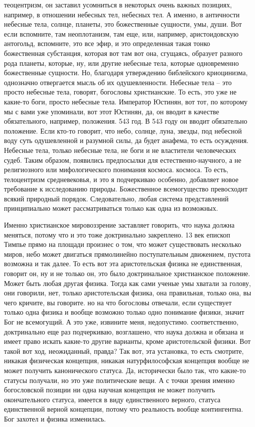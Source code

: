 теоцентризм, он заставил усомниться в некоторых
очень важных позициях, например, в отношении небесных тел, небесных тел. А
именно, в античности небесные тела, солнце, планеты, это божественные сущности,
умы, души. Вот если вспомните, там неоплотанизм, там еще, или, например,
аристоидовскую антогольд, вспомните, это все эфир, и это определенная такая
тонко божественная субстанция, которая вот там вот она, сгущаясь, образует
разного рода планеты, которые, ну, или другие небесные тела, которые
одновременно божественные сущности. Но, благодаря утверждению библейского
криоцинизма, однозначно отвергается мысль об их одушевленности. Небесные тела –
это просто небесные тела, говорят, богословы христианские. То есть, это уже не
какие-то боги, просто небесные тела. Император Юстинян, вот тот, по которому мы
с вами уже упоминали, вот этот Юстинян, да, он вводит в качестве обязательного,
например, положения. 543 год. В 543 году он вводит обязательно положение. Если
кто-то говорит, что небо, солнце, луна, звезды, под небесной воду суть
одушевленной и разумной силы, да будет анафема, то есть осуждения. Небесные
тела, только небесные тела, не боги и не властители человеческих судеб. Таким
образом, появились предпосылки для естественно-научного, а не религиозного или
мифологического понимания космоса. космоса. То есть, телоцентризм средневековья,
и это я подчеркиваю особенно, добавляет новое требование к исследованию природы.
Божественное всемогущество превосходит всякий природный порядок. Следовательно,
любая система представлений принципиально может рассматриваться только как одна
из возможных. 

Именно христианское мировоззрение заставляет говорить, что наука должна меняться, потому что и это тоже доктринально закреплено. 13 век епископ Тимпье прямо на площади произнес о том, что может существовать несколько миров, небо может двигаться прямолинейно
поступательным движением, пустота возможна и так далее. То есть вот эта
аристотельская физика не единственная, говорит он, ну и не только он, это было
доктринальное христианское положение. Может быть любая другая физика. Тогда как
сами ученые умы хватали за голову, они говорили, нет, только аристотельская
физика, она правильная, только она, вы чего кричите, вы говорите. но на что
богословы отвечали, если существует только одна физика и вообще возможно только
одно понимание физики, значит Бог не всемогущий. А это уже, извините меня,
недопустимо. соответственно, доктринально еще раз подчеркиваю, возглашено, что
наука должна и обязана и имеет право искать какие-то другие варианты, кроме
аристотельской физики. Вот такой вот ход, неожиданный, правда? Так вот, эта
установка, то есть смотрите, никакая физическая концепция, никакая
натурфилософская концепция вообще не может получить канонического статуса. Да,
исторически было так, что какие-то статусы получали, но это уже политические
вещи. А с точки зрения именно богословской позиции ни одна научная концепция не
может получить окончательного статуса, имеется в виду единственного верного,
статуса единственной верной концепции, потому что реальность вообще
контингентна. Бог захотел и физика изменилась. 


